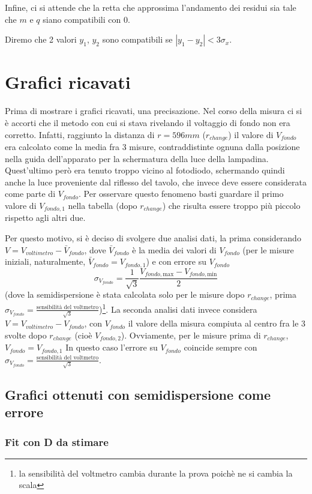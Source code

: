 \documentclass[10pt,twocolumn]{article}
\begin{document}
\noindent Infine, ci si attende che la retta che approssima l'andamento dei residui sia tale che $m$ e $q$ siano compatibili con 0.

Diremo che 2 valori $y_1$, $y_2$ sono compatibili se $\left|y_1 - y_2\right| < 3\sigma_x$.
\section{Grafici ricavati}
Prima di mostrare i grafici ricavati, una precisazione. Nel corso della misura ci si è accorti che il metodo con cui si stava rivelando il voltaggio di fondo non era corretto. Infatti, raggiunto la distanza di $r= 596 mm$ ($r_{change}$) il valore di $V_{fondo}$ era calcolato come la media fra 3 misure,
contraddistinte ognuna dalla posizione nella guida dell'apparato per la schermatura della luce della lampadina.
Quest'ultimo però era tenuto troppo vicino al fotodiodo, schermando quindi anche la luce proveniente dal riflesso del tavolo, che invece deve essere considerata come parte di $V_{fondo}$.
Per osservare questo fenomeno basti guardare il primo valore di $V_{fondo,1}$ nella tabella  (dopo $r_{change}$) che risulta essere troppo più piccolo rispetto agli altri due.

\noindent Per questo motivo, si è deciso di svolgere due analisi dati, la prima considerando $V = V_{voltimetro} - \bar{V}_{fondo}$, dove $\bar{V}_{fondo}$ è la media dei valori di $V_{fondo}$ (per le misure iniziali, naturalmente, $\bar{V}_{fondo}=V_{fondo,1}$) e con errore su $V_{fondo}$
\[
\sigma_{V_{fondo}} = \frac{1}{\sqrt{3}}\frac{V_{fondo, \text{max}} - V_{fondo, \text{min}}}{2}
\]
(dove la semidispersione è stata calcolata solo per le misure dopo $r_{change}$, prima $\sigma_{V_{fondo}}=\frac{\text{sensibilità del voltmetro}}{\sqrt{3}}$)\footnote{la sensibilità del voltmetro cambia durante la prova poichè ne si cambia la scala}. 
La seconda analisi dati invece considera $V = V_{voltimetro} - V_{fondo}$, con $V_{fondo}$ il valore della misura compiuta al centro fra le 3 svolte dopo $r_{change}$ (cioè $V_{fondo,2}$). Ovviamente, per le misure prima di $r_{change}$, $V_{fondo}=V_{fondo,1}$
In questo caso l'errore su $V_{fondo}$ coincide sempre con $\sigma_{V_{fondo}} = \frac{\text{sensibilità del voltmetro}}{\sqrt{3}}$.

\subsection{Grafici ottenuti con semidispersione come errore}
 \subsubsection{Fit con D da stimare}
\end{document}
